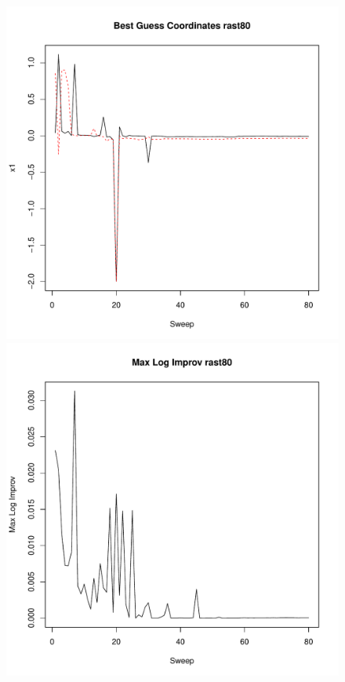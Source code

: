 \documentclass{article}
\begin{document}
\clearpage

\begin{figure}
	\begin{center}
		\begin{minipage}[h!]{0.49\textwidth}
			\includegraphics[width=1.0\textwidth]{rast80Coord.pdf}
		\end{minipage}
		\begin{minipage}[h!]{0.49\textwidth}
			\includegraphics[width=1.0\textwidth]{rast80MLI.pdf}	
		\end{minipage}
	\end{center}
\end{figure}
\end{document}

